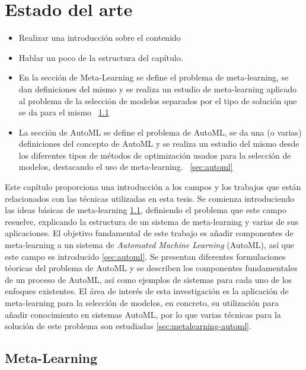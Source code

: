 \chapter{Estado del arte }\label{chapter:review}

 \begin{itemize}
 	\item Realizar una introducción sobre el contenido 
 	\item Hablar un poco de la estructura del capítulo.
 	 \item En la sección de Meta-Learning se define el problema de meta-learning, se dan definiciones del mismo y se realiza un estudio de meta-learning aplicado al problema de la selección de modelos separados por el tipo de solución que se da para el mismo ~\ref{sec:metalearning}
 	\item La sección de AutoML se define el problema de AutoML, se da una (o varias) definiciones del concepto de AutoML y se realiza un estudio del mismo desde los diferentes tipos de métodos de optimización usados para la selección de modelos, destacando el uso de meta-learning. ~\ref{sec:automl}
 \end{itemize}
 
 Este capítulo proporciona una introducción a los campos y los trabajos que están relacionados con las técnicas utilizadas en esta tesis. Se comienza introduciendo las ideas básicas de meta-learning \ref{sec:metalearning}, definiendo el problema que este campo resuelve, explicando la estructura de un sistema de meta-learning y varias de sus aplicaciones. El objetivo fundamental de este trabajo es añadir componentes de meta-learning a un sistema de \textit{Automated Machine Learning} (AutoML), así que este campo es introducido \ref{sec:automl}. Se presentan diferentes formulaciones téoricas del problema de AutoML y se describen los componentes fundamentales de un proceso de AutoML, así como ejemplos de sistemas para cada uno de los enfoques existentes. El área de interés de esta investigación es la aplicación de meta-learning para la selección de modelos, en concreto, su utilización para añadir conocimiento en sistemas AutoML, por lo que varias técnicas para la solución de este problema son estudiadas \ref{sec:metalearning-automl}.

\section{Meta-Learning}\label{sec:metalearning}


